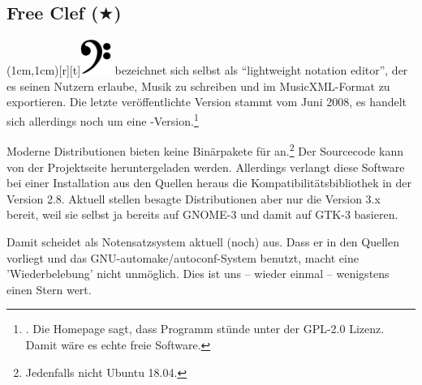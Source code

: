 %
%
%

\subsection{Free Clef ($\bigstar$)}

\parpic(1cm,1cm)[r][t]{\includegraphics[width=1cm]{logos/freeclef-700dpi.png}}
\label{FreeClef} bezeichnet sich selbst als \enquote{lightweight
notation editor}, der es seinen Nutzern erlaube, Musik zu schreiben und im
MusicXML-Format zu exportieren. Die letzte veröffentlichte Version stammt vom
Juni 2008, es handelt sich allerdings noch um eine
-Version.\footnote{\cite[vgl.][\nopage wp]{FreeClef2008a}. Die Homepage
sagt, dass Programm stünde unter der GPL-2.0 Lizenz. Damit wäre es echte freie
Software.}

Moderne Distributionen bieten keine Binärpakete für 
an.\footnote{Jedenfalls nicht Ubuntu 18.04.} Der Sourcecode kann von der
Projektseite heruntergeladen werden. Allerdings verlangt diese Software bei
einer Installation aus den Quellen heraus die Kompatibilitätsbibliothek
 in der Version 2.8. Aktuell stellen besagte Distributionen aber
nur die Version 3.x bereit, weil sie selbst ja bereits auf GNOME-3 und damit auf
GTK-3 basieren.

Damit scheidet  als Notensatzsystem aktuell (noch) aus. Dass er
in den Quellen vorliegt und das GNU-automake/autoconf-System benutzt, macht eine
'Wiederbelebung' nicht unmöglich. Dies ist uns -- wieder einmal -- wenigstens
einen Stern wert.



%
